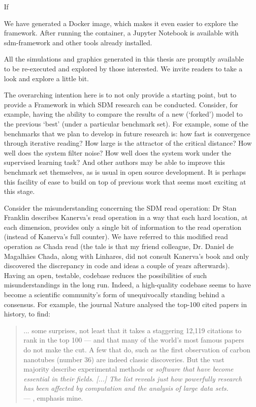 If

We have generated a Docker image, which makes it even easier to explore the framework. After running the container, a Jupyter Notebook is available with sdm-framework and other tools already installed.


All the simulations and graphics generated in this thesis are promptly available to be re-executed and explored by those interested. We invite readers to take a look and explore a little bit.



The overarching intention here is to not only provide a starting point, but to provide a Framework in which SDM research can be conducted.  Consider, for example, having the ability to compare the results of a new (‘forked’) model to the previous `best' (under a particular benchmark set).  For example, some of the benchmarks that we plan to develop in future research is: how fast is convergence through iterative reading?  How large is the attractor of the critical distance?  How well does the system filter noise?  How well does the system work under the supervised learning task?  And other authors may be able to improve this benchmark set themselves, as is usual in open source development.  It is perhaps this facility of ease to build on top of previous work that seems most exciting at this stage.

Consider the misunderstanding concerning the SDM read operation:  Dr Stan Franklin describes Kanerva's read operation in a way that each hard location, at each dimension, provides only a single bit of information to the read operation (instead of Kanerva's full counter).  We have referred to this modified read operation as Chada read (the tale is that my friend \text{\&} colleague, Dr. Daniel de Magalhães Chada, along with Linhares, did not consult Kanerva's book and only discovered the discrepancy in code and ideas a couple of years afterwards).  Having an open, testable, codebase reduces the possibilities of such misunderstandings in the long run.  Indeed, a high-quality codebase seems to have become a scientific community's form of unequivocally standing behind a consensus. For example, the journal Nature analysed the top-100 cited papers in history, to find:

\begin{quote}
... some surprises, not least that it takes a staggering 12,119 citations to rank in the top 100 — and that many of the world’s most famous papers do not make the cut. A few that do, such as the first observation of carbon nanotubes (number 36) are indeed classic discoveries. But the vast majority describe experimental methods or \emph{software that have become essential in their fields. [...] The list reveals just how powerfully research has been affected by computation and the analysis of large data sets.} \\
\hfill --- \citet{van2014top}, emphasis mine.
\end{quote}

